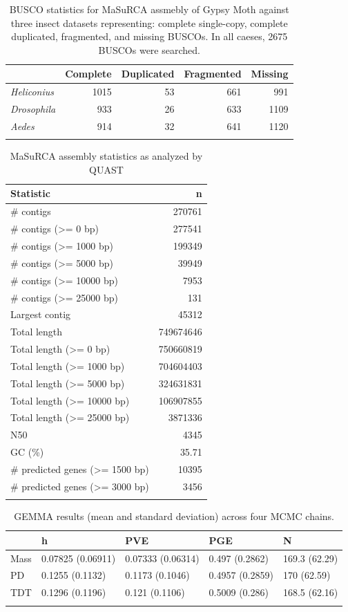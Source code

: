 \documentclass[smallextended]{svjour3}
\begin{document}
\begin{longtable}[]{@{}lrrrr@{}}
\caption{BUSCO statistics for MaSuRCA assmebly of Gypsy Moth against three
insect 
datasets representing: complete single-copy, complete duplicated, fragmented,
and 
missing BUSCOs. In all caeses, \num{2675} BUSCOs were searched.}\\
\toprule
& Complete & Duplicated & Fragmented & Missing\tabularnewline
\midrule
\endhead
\textit{Heliconius} & 1015 & 53 & 661 & 991\tabularnewline
\textit{Drosophila} & 933 & 26 & 633 & 1109\tabularnewline
\textit{Aedes} & 914 & 32 & 641 & 1120\tabularnewline
\bottomrule
\label{tab:busco}
\end{longtable}

\clearpage

\begin{longtable}[]{@{}lr@{}}
\caption{MaSuRCA assembly statistics as analyzed by QUAST}\\
\toprule
Statistic & n\tabularnewline
\midrule
\endhead
\# contigs & \num{270761}\tabularnewline
\# contigs (\textgreater{}= 0 bp) & \num{277541}\tabularnewline
\# contigs (\textgreater{}= 1000 bp) & \num{199349}\tabularnewline
\# contigs (\textgreater{}= 5000 bp) & \num{39949}\tabularnewline
\# contigs (\textgreater{}= \num{10000} bp) & \num{7953}\tabularnewline
\# contigs (\textgreater{}= \num{25000} bp) & \num{131}\tabularnewline
Largest contig & \num{45312}\tabularnewline
Total length & \num{749674646}\tabularnewline
Total length (\textgreater{}= 0 bp) & \num{750660819}\tabularnewline
Total length (\textgreater{}= 1000 bp) & \num{704604403}\tabularnewline
Total length (\textgreater{}= 5000 bp) & \num{324631831}\tabularnewline
Total length (\textgreater{}= \num{10000} bp) & \num{106907855}\tabularnewline
Total length (\textgreater{}= \num{25000} bp) & \num{3871336}\tabularnewline
N50 & 4345\tabularnewline
GC (\%) & 35.71\tabularnewline
\# predicted genes (\textgreater{}= 1500 bp) & \num{10395}\tabularnewline
\# predicted genes (\textgreater{}= 3000 bp) & 3456\tabularnewline
\bottomrule
\label{tab:masurca}
\end{longtable}


\clearpage

\begin{longtable}[]{@{}lllll@{}}
\caption{GEMMA results (mean and standard deviation) across four MCMC
chains.}\\
\toprule
& h & PVE & PGE & N\tabularnewline
\midrule
\endhead
Mass & 0.07825 (0.06911) & 0.07333 (0.06314) & 0.497 (0.2862) & 169.3
(62.29)\tabularnewline
PD & 0.1255 (0.1132) & 0.1173 (0.1046) & 0.4957 (0.2859) & 170
(62.59)\tabularnewline
TDT & 0.1296 (0.1196) & 0.121 (0.1106) & 0.5009 (0.286) & 168.5
(62.16)\tabularnewline
\bottomrule
\label{tab:gemma}
\end{longtable}
\end{document}
